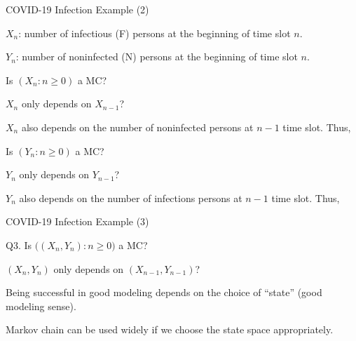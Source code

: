 \begin{frame}{COVID-19 Infection Example (2)}

\plitemsep 0.1in

\bce[Q1.] 

\item<1->[$\bullet$] $X_n$: number of infectious (F) persons at the beginning of time slot $n.$

\item<1->[$\bullet$] $Y_n$: number of noninfected (N) persons at the beginning of time slot $n.$




  
\item<2-> Is $(X_n: n \ge 0)$ a MC?
  \bci
  \item<3-> $X_n$ only depends on $X_{n-1}$? 
  \item<4-> $X_n$ also depends on the number of noninfected persons at $n-1$
    time slot. Thus, 
    \eci

  \item<2-> Is $(Y_n: n \ge 0)$ a MC?
    \bci
\item<3-> $Y_n$ only depends on $Y_{n-1}$?
  \item<5-> $Y_n$ also depends on the number of infections persons at $n-1$
    time slot. Thus, 
  \eci

    
  \ece
\end{frame}



\begin{frame}{COVID-19 Infection Example (3)}

\plitemsep 0.1in

\bci
\item[Q3.] Is $\Big((X_n,Y_n): n \ge 0 \Big)$ a MC?
  \bci
  \item $(X_n,Y_n)$ only depends on $(X_{n-1},Y_{n-1})$?
  \item<2-> 
    \eci

  \item<3-> 

\bci
\item<3->  Being successful in good modeling depends on
  the choice of ``state'' (good modeling sense). 
\item<4-> Markov chain can be used widely if we choose the state space
  appropriately. 

  \eci
  \eci
\end{frame}


